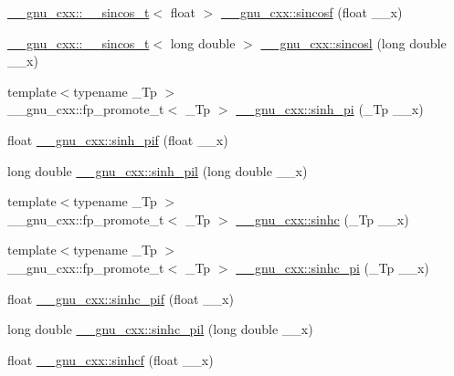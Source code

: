 \begin{DoxyCompactItemize}
\item 
\hyperlink{struct____gnu__cxx_1_1____sincos__t}{\+\_\+\+\_\+gnu\+\_\+cxx\+::\+\_\+\+\_\+sincos\+\_\+t}$<$ float $>$ \hyperlink{group__gnu__math__spec__func_ga3929d13e38535418cd24db5cee80660c}{\+\_\+\+\_\+gnu\+\_\+cxx\+::sincosf} (float \+\_\+\+\_\+x)
\item 
\hyperlink{struct____gnu__cxx_1_1____sincos__t}{\+\_\+\+\_\+gnu\+\_\+cxx\+::\+\_\+\+\_\+sincos\+\_\+t}$<$ long double $>$ \hyperlink{group__gnu__math__spec__func_ga96a7222e47d430a228973658ca9f6f35}{\+\_\+\+\_\+gnu\+\_\+cxx\+::sincosl} (long double \+\_\+\+\_\+x)
\item 
{\footnotesize template$<$typename \+\_\+\+Tp $>$ }\\\+\_\+\+\_\+gnu\+\_\+cxx\+::fp\+\_\+promote\+\_\+t$<$ \+\_\+\+Tp $>$ \hyperlink{group__gnu__math__spec__func_gade43453b87b6b38c05b3fcce40870542}{\+\_\+\+\_\+gnu\+\_\+cxx\+::sinh\+\_\+pi} (\+\_\+\+Tp \+\_\+\+\_\+x)
\item 
float \hyperlink{group__gnu__math__spec__func_ga74103f57ab0d97126732f3cb276c5ab3}{\+\_\+\+\_\+gnu\+\_\+cxx\+::sinh\+\_\+pif} (float \+\_\+\+\_\+x)
\item 
long double \hyperlink{group__gnu__math__spec__func_ga2232ee554ef2a902824db42e2e09c483}{\+\_\+\+\_\+gnu\+\_\+cxx\+::sinh\+\_\+pil} (long double \+\_\+\+\_\+x)
\item 
{\footnotesize template$<$typename \+\_\+\+Tp $>$ }\\\+\_\+\+\_\+gnu\+\_\+cxx\+::fp\+\_\+promote\+\_\+t$<$ \+\_\+\+Tp $>$ \hyperlink{group__gnu__math__spec__func_gaf2f02e4143e7beb97352cef4b7fcb663}{\+\_\+\+\_\+gnu\+\_\+cxx\+::sinhc} (\+\_\+\+Tp \+\_\+\+\_\+x)
\item 
{\footnotesize template$<$typename \+\_\+\+Tp $>$ }\\\+\_\+\+\_\+gnu\+\_\+cxx\+::fp\+\_\+promote\+\_\+t$<$ \+\_\+\+Tp $>$ \hyperlink{group__gnu__math__spec__func_ga8bb6034e28d48879845bf64818cc06e1}{\+\_\+\+\_\+gnu\+\_\+cxx\+::sinhc\+\_\+pi} (\+\_\+\+Tp \+\_\+\+\_\+x)
\item 
float \hyperlink{group__gnu__math__spec__func_ga26e54504db6541550266140f5264acbe}{\+\_\+\+\_\+gnu\+\_\+cxx\+::sinhc\+\_\+pif} (float \+\_\+\+\_\+x)
\item 
long double \hyperlink{group__gnu__math__spec__func_gaa572bf7633f457c86cef65bfd6ec4ad9}{\+\_\+\+\_\+gnu\+\_\+cxx\+::sinhc\+\_\+pil} (long double \+\_\+\+\_\+x)
\item 
float \hyperlink{group__gnu__math__spec__func_gadaa7ea78625cc2eeb70213a50719813d}{\+\_\+\+\_\+gnu\+\_\+cxx\+::sinhcf} (float \+\_\+\+\_\+x)

\end{DoxyCompactItemize}

